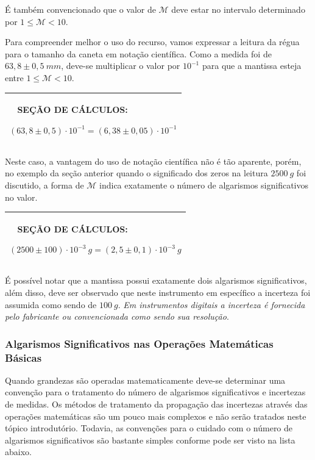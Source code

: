 \documentclass[a4paper, 11pt]{report}
\newenvironment{myboxed}
    {
        \begin{center}
        \begin{tabular}{p{0.7\textwidth}}
        \hline\
    }
    { 
        \\\hline
        \end{tabular} 
        \end{center}
    }
\begin{document}
É também convencionado que o valor de $\mathcal{M}$ deve estar no intervalo 
determinado por $1 \leq \mathcal{M} < 10$.

Para compreender melhor o uso do recurso, vamos expressar a leitura da régua 
para o tamanho da caneta em notação científica. Como a medida foi de 
$63,8 \pm 0,5 \: mm$, deve-se multiplicar o valor por $10^{-1}$ para que a 
mantissa esteja entre $1 \leq \mathcal{M} < 10$.

\begin{myboxed}
    \textbf{SEÇÃO DE CÁLCULOS:}

    $
        (63,8 \pm 0,5) \cdot 10^{-1} = (6,38 \pm 0,05) \cdot 10^{-1}
    $
\end{myboxed}

Neste caso, a vantagem do uso de notação científica não é tão aparente, porém, 
no exemplo da seção anterior quando o significado dos zeros na leitura 
$2500 \: g$ foi discutido, a forma de $\mathcal{M}$ indica exatamente o número 
de algarismos significativos no valor.

\begin{myboxed}
    \textbf{SEÇÃO DE CÁLCULOS:}

    $
        (2500 \pm 100) \cdot 10^{-3} \: g = (2,5 \pm 0,1) \cdot 10^{-3} \: g
    $
\end{myboxed}

É possível notar que a mantissa possui exatamente dois algarismos 
significativos, além disso, deve ser observado que neste instrumento em 
específico a incerteza foi assumida como sendo de $100 \: g$. \emph{Em 
instrumentos digitais a incerteza é fornecida pelo fabricante ou convencionada 
como sendo sua resolução}.

\subsubsection{Algarismos Significativos nas Operações Matemáticas 
Básicas}

Quando grandezas são operadas matematicamente deve-se determinar uma convenção 
para o tratamento do número de algarismos significativos e incertezas de 
medidas. Os métodos de tratamento da propagação das incertezas através das 
operações matemáticas são um pouco mais complexos e não serão tratados neste 
tópico introdutório. Todavia, as convenções para o cuidado com o número de 
algarismos significativos são bastante simples conforme pode ser visto na lista
abaixo.
\end{document}
